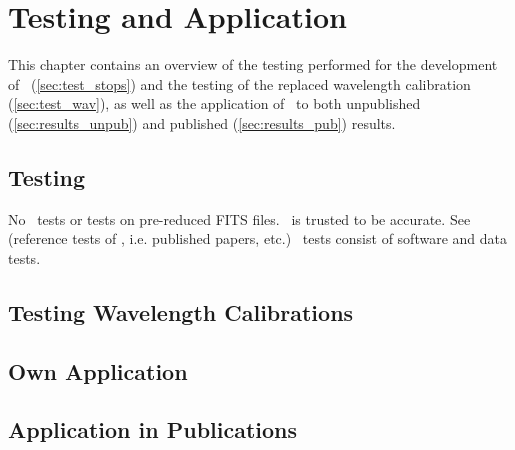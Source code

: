 \chapter{Testing and Application}

This chapter contains an overview of the testing performed for the development of \stops\ (\autoref{sec:test_stops}) and the testing of the replaced wavelength calibration (\autoref{sec:test_wav}), as well as the application of \stops\ to both unpublished (\autoref{sec:results_unpub}) and published (\autoref{sec:results_pub}) results.

\section[Testing \textsc{stops}]{Testing \stops} \label{sec:test_stops}
\hrulefill

No \polsalt\ tests or tests on pre-reduced \gls{FITS} files. \polsalt\ is trusted to be accurate. See (reference tests of \polsalt, i.e. published papers, etc.)
\stops\ tests consist of software and data tests. 


\section{Testing Wavelength Calibrations} \label{sec:test_wav}



\section{Own Application} \label{sec:results_unpub}



\section{Application in Publications} \label{sec:results_pub}




